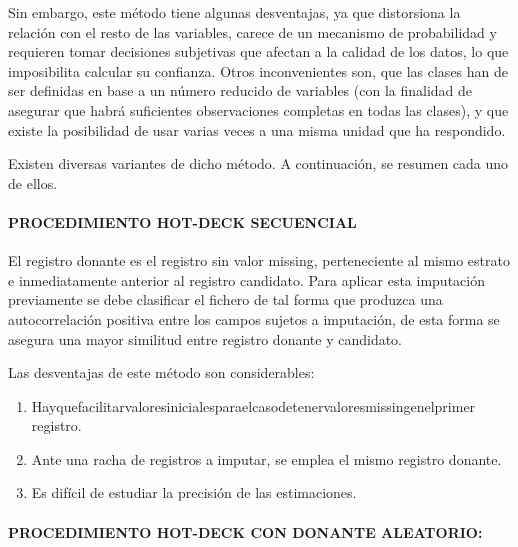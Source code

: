 \documentclass[
  openany]{book}
\begin{document}
Sin embargo, este método tiene algunas desventajas, ya que distorsiona la relación con el resto de las variables, carece de un mecanismo de probabilidad y requieren tomar decisiones subjetivas que afectan a la calidad de los datos, lo que imposibilita calcular su confianza. Otros inconvenientes son, que las clases han de ser definidas en base a un número reducido de variables (con la finalidad de asegurar que habrá suficientes observaciones completas en todas las clases), y que existe la posibilidad de usar varias veces a una misma unidad que ha respondido.

Existen diversas variantes de dicho método. A continuación, se resumen cada uno de ellos.

\hypertarget{procedimiento-hot-deck-secuencial}{%
\paragraph{\texorpdfstring{\textbf{PROCEDIMIENTO HOT-DECK SECUENCIAL}}{PROCEDIMIENTO HOT-DECK SECUENCIAL}}\label{procedimiento-hot-deck-secuencial}}

El registro donante es el registro sin valor missing, perteneciente al mismo estrato e inmediatamente anterior al registro candidato. Para aplicar esta imputación previamente se debe clasificar el fichero de tal forma que produzca una autocorrelación positiva entre los campos sujetos a imputación, de esta forma se asegura una mayor similitud entre registro donante y candidato.

Las desventajas de este método son considerables:

\begin{enumerate}
\def\labelenumi{\arabic{enumi}.}
\item
  Hayquefacilitarvaloresinicialesparaelcasodetenervaloresmissingenelprimer registro.
\item
  Ante una racha de registros a imputar, se emplea el mismo registro donante.
\item
  Es difícil de estudiar la precisión de las estimaciones.
\end{enumerate}

\hypertarget{procedimiento-hot-deck-con-donante-aleatorio}{%
\paragraph{\texorpdfstring{\textbf{PROCEDIMIENTO HOT-DECK CON DONANTE ALEATORIO:}}{PROCEDIMIENTO HOT-DECK CON DONANTE ALEATORIO:}}\label{procedimiento-hot-deck-con-donante-aleatorio}}
\end{document}
